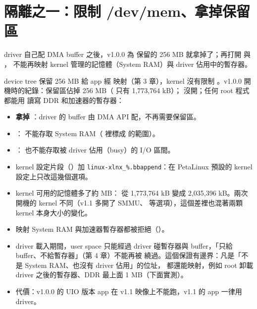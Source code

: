\section{隔離之一：限制 /dev/mem、拿掉保留區}
\label{sec:devmem}

\begin{oneline}
driver 自己配 DMA buffer 之後，v1.0.0 為  保留的 256 MB 就拿掉了；再打開  與 ， 不能再映射 kernel 管理的記憶體（System RAM）與 driver 佔用中的暫存器。
\end{oneline}

\begin{before}
device tree 保留 256 MB 給 app 經  映射（第 3 章），kernel 沒有限制 。v1.0.0 開機時的紀錄：保留區佔掉 256 MB（ 只有 1,773,764 kB）； 沒開；任何 root 程式都能用  讀寫 DDR 和加速器的暫存器：

\end{before}

\begin{tech}
\begin{itemize}
\item \textbf{拿掉 }：driver 的 buffer 由 DMA API 配，不再需要保留區。
\item {}： 不能存取 System RAM（ 裡標成  的範圍）。
\item {}： 也不能存取被 driver 佔用（busy）的 I/O 區間。
\item kernel 設定片段（）加 \texttt{linux-xlnx\_\%.bbappend}：在 PetaLinux 預設的 kernel 設定上只改這幾個選項。
\end{itemize}
\end{tech}

\begin{gain}
\begin{itemize}
\item kernel 可用的記憶體多了約 \memGainMB{} MB： 從 1,773,764 kB 變成 2,035,396 kB。兩次開機的 kernel 不同（v1.1 多開了 SMMU、 等選項），這個差裡也混著兩顆 kernel 本身大小的變化。
\item {} 映射 System RAM 與加速器暫存器都被拒絕（）。
\item driver 載入期間，user space 只能經過 driver 碰暫存器與 buffer，「只給 buffer、不給暫存器」（第 4 章）不能再被  繞過。這個保證有邊界：凡是「不是 System RAM、也沒有 driver 佔用」的位址， 都還能映射，例如 root 卸載 driver 之後的暫存器、DDR 最上面 1 MB（下面實測）。
\item 代價：v1.0.0 的 UIO 版本 app 在 v1.1 映像上不能跑，v1.1 的 app 一律用 driver。
\end{itemize}
\end{gain}

